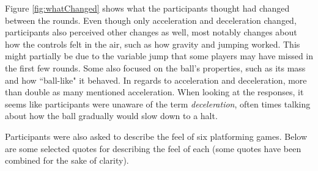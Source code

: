 
Figure \ref{fig:whatChanged} shows what the participants thought had changed between the rounds. Even though only acceleration and deceleration changed, participants also perceived other changes as well, most notably changes about how the controls felt in the air, such as how gravity and jumping worked. This might partially be due to the variable jump that some players may have missed in the first few rounds. Some also focused on the ball's properties, such as its mass and how ``ball-like" it behaved. In regards to acceleration and deceleration, more than double as many mentioned acceleration. When looking at the responses, it seems like participants were unaware of the term \textit{deceleration}, often times talking about how the ball gradually would slow down to a halt.


Participants were also asked to describe the feel of six platforming games. Below are some selected quotes for describing the feel of each (some quotes have been combined for the sake of clarity).

